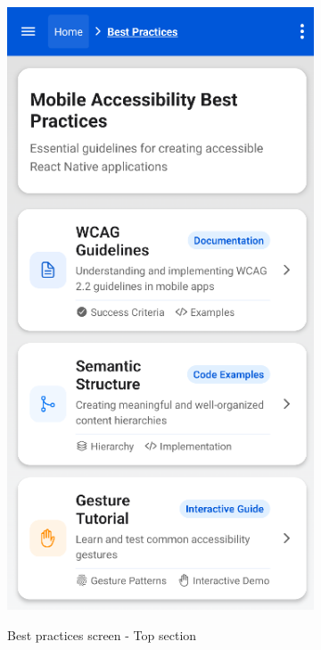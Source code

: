 \begin{figure}[ht]
\begin{subfigure}[b]{0.48\textwidth}
        \includegraphics[width=\linewidth, alt={First part of the Best Practices Screen}]{img/practices1.png}
        \caption{Best practices screen - Top section}
        \label{fig:best-practices-top}
    \end{subfigure}
    \hfill
    \begin{subfigure}[b]{0.48\textwidth}

\end{subfigure}
\end{figure}
